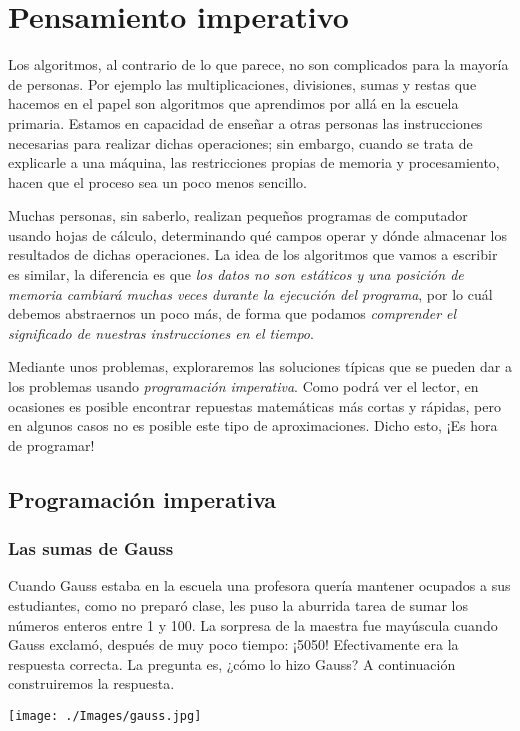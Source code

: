 \chapter{Pensamiento imperativo}

Los algoritmos, al contrario de lo que parece, no son complicados para la mayoría de personas. Por ejemplo las multiplicaciones, divisiones, sumas y restas que hacemos en el papel son algoritmos que aprendimos por allá en la escuela primaria. Estamos en capacidad de enseñar a otras personas las instrucciones necesarias para realizar dichas operaciones; sin embargo, cuando se trata de explicarle a una máquina, las restricciones propias de memoria y procesamiento, hacen que el proceso sea un poco menos sencillo.

Muchas personas, sin saberlo, realizan pequeños programas de computador usando hojas de cálculo, determinando qué campos operar y dónde almacenar los resultados de dichas operaciones. La idea de los algoritmos que vamos a escribir es similar, la diferencia es que \emph{los datos no son estáticos y una posición de memoria cambiará muchas veces durante la ejecución del programa}, por lo cuál debemos abstraernos un poco más, de forma que podamos \emph{comprender el significado de nuestras instrucciones en el tiempo}.

Mediante unos problemas, exploraremos las soluciones típicas que se pueden dar a los problemas usando \emph{programación imperativa}. Como podrá ver el lector, en ocasiones es posible encontrar repuestas matemáticas más cortas y rápidas, pero en algunos casos no es posible este tipo de aproximaciones. Dicho esto, ¡Es hora de programar!

\section{Programación imperativa}

\subsection{Las sumas de Gauss}

\begin{minipage}{.7\textwidth} 
Cuando Gauss estaba en la escuela una profesora quería mantener ocupados a sus estudiantes, como no preparó clase, les puso la aburrida tarea de sumar los números enteros entre 1 y 100. La sorpresa de la maestra fue mayúscula cuando Gauss exclamó, después de muy poco tiempo: ¡5050! Efectivamente era la respuesta correcta. La pregunta es, ¿cómo lo hizo Gauss? A continuación construiremos la respuesta.
\end{minipage}
\begin{minipage}{.30\textwidth}
  \centering
  \texttt{[image: ./Images/gauss.jpg]}
\end{minipage}

